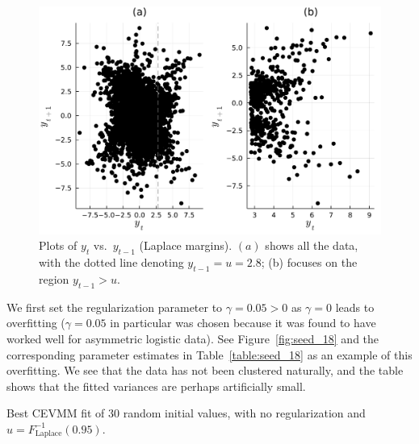 \documentclass[11pt,twoside,openany]{book}
\numberwithin{Theorem}{chapter}
\numberwithin{Definition}{chapter}
\numberwithin{Lemma}{chapter}
\numberwithin{Algorithm}{chapter}
\numberwithin{equation}{chapter}
\begin{document}
\begin{figure}[htp]
  \centering
  \includegraphics[scale=0.75]{../elexon/figures/first-order-raw.pdf}
  \caption{Plots of $y_t$ vs.\ $y_{t-1}$ (Laplace margins). $(a)$ shows all the data,
    with the dotted line denoting $y_{t-1}=u=2.8$; (b) focuses on the region $y_{t-1}>u$.}\label{fig:imb_first_order_tail}
\end{figure}

We first set the regularization parameter to $\gamma=0.05>0$ as
$\gamma = 0$ leads to overfitting ($\gamma = 0.05$ in particular was chosen
because it was found to have worked well for asymmetric logistic data).
See Figure~\ref{fig:seed_18} and the corresponding
parameter estimates in Table~\ref{table:seed_18} as an example of this overfitting.
We see that the data has not been
clustered naturally, and the table shows that the fitted variances
are perhaps artificially small.

\begin{table}[htp]\centering
   \caption{Best CEVMM fit of 30 random initial values, with no regularization and $u=F_{\text{Laplace}}^{-1}(0.95)$.\label{table:seed_18} }
\end{table}
\end{document}
